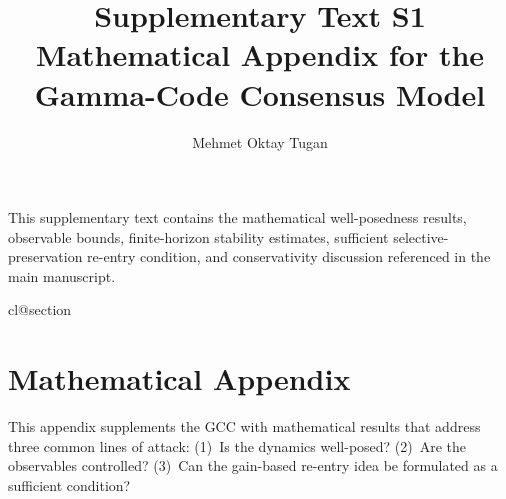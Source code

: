 \documentclass[11pt]{article}
\title{Supplementary Text S1\\Mathematical Appendix for the Gamma-Code Consensus Model}
\author{Mehmet Oktay Tugan}
\date{}
\theoremstyle{plain}
\theoremstyle{definition}
\theoremstyle{remark}
\begin{document}
\maketitle

\noindent This supplementary text contains the mathematical well-posedness results, observable bounds, finite-horizon stability estimates, sufficient selective-preservation re-entry condition, and conservativity discussion referenced in the main manuscript.

\appendix
\makeatletter
\providecommand*{\@removefromreset}[2]{%
  \let\@tempa\@elt
  \let\@elt\relax
  \expandafter\let\expandafter\@tempb\csname cl@#2\endcsname
  \expandafter\def\csname cl@#2\endcsname{}%
  \def\@elt##1{%
    \ifx ##1#1\else
      \expandafter\@temptokena\expandafter{\csname cl@#2\endcsname}%
      \edef\x{\noexpand\expandafter\noexpand\def\noexpand\csname cl@#2\noexpand\endcsname{\the\@temptokena \noexpand\@elt{##1}}}\x
    \fi}%
  \@tempb
  \let\@elt\@tempa}
\@removefromreset{theorem}{section}
\makeatother
\section*{Mathematical Appendix}
\label{sec:appendix}
\setcounter{section}{0}
\setcounter{theorem}{0}
\renewcommand{\thesection}{A.\arabic{section}}
\renewcommand{\thesubsection}{A.\arabic{section}.\arabic{subsection}}
\renewcommand{\thetheorem}{A.\arabic{theorem}}

\titleformat{\section}{\large\bfseries}{\thesection}{0.6em}{}
\titlespacing*{\section}{0pt}{1.5em}{0.8em}


This appendix supplements the GCC with mathematical results that address three common lines of attack: (1)~Is the dynamics well-posed? (2)~Are the observables controlled? (3)~Can the gain-based re-entry idea be formulated as a sufficient condition?
\end{document}
